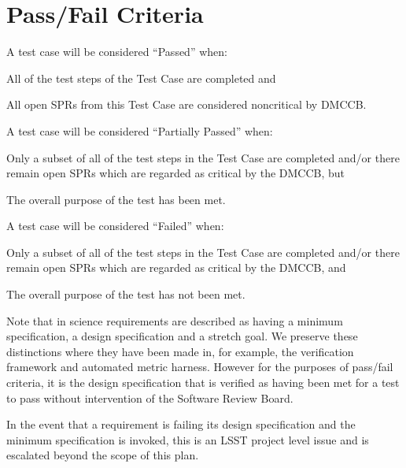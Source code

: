 \section{Pass/Fail Criteria}

A test case will be considered ``Passed'' when:
\begin{itemize_single}
\item All of the test steps of the Test Case are completed and
\item All open SPRs from this Test Case are considered noncritical by DMCCB.
\end{itemize_single}

A test case will be considered ``Partially Passed'' when:
\begin{itemize_single}
\item Only a subset of all of the test steps in the Test Case are completed and/or there remain open SPRs which are regarded as critical by the DMCCB, but
\item The overall purpose of the test has been met.
\end{itemize_single}

A test case will be considered ``Failed'' when:
\begin{itemize_single}
\item Only a subset of all of the test steps in the Test Case are completed and/or there remain open SPRs which are regarded as critical by the DMCCB, and
\item The overall purpose of the test has not been met.
\end{itemize_single}

Note that in  science requirements are described as having a minimum specification, a design specification and a stretch goal.
We preserve these distinctions where they have been made in, for example, the verification framework and automated metric harness.
However for the purposes of pass/fail criteria, it is the design specification that is verified as having been met for a test to pass without intervention of the Software Review Board.

In the event that a requirement is failing its design specification and the minimum specification is invoked, this is an LSST project level issue and is escalated beyond the scope of this plan.
